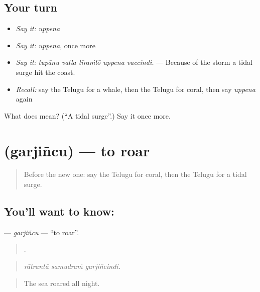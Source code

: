 \subsection*{Your turn}
\begin{itemize}
\raggedright
  \item \emph{Say it:} \emph{uppena}
  \item \emph{Say it:} \emph{uppena}, once more
  \item \emph{Say it:} \emph{tupānu valla tīraṁlō uppena vaccindi.} — Because of the storm a tidal surge hit the coast.
  \item \emph{Recall:} say the Telugu for a whale, then the Telugu for coral, then say \emph{uppena} again
\end{itemize}

\begin{tcolorbox}[breakable,colback=teal!4,colframe=teal!35!black,title={Before you move on}]
What does  mean? (\textquotedblleft{}A tidal surge\textquotedblright{}.) Say it once more.
\end{tcolorbox}
\section[\texorpdfstring{\te{గర్జించు} (garjiñcu)}{గర్జించు (garjiñcu)}]{ (garjiñcu) — to roar}

\label{lesson:TE-C473-garjincu}



\begin{quote}
Before the new one: say the Telugu for coral, then the Telugu for a tidal surge.
\end{quote}

\subsection*{You'll want to know: }
\textbf{} — \emph{garjiñcu} — \textquotedblleft{}to roar\textquotedblright{}.

\begin{quote}
  .
\end{quote}

\begin{quote}
\emph{rātrantā samudraṁ garjiñcindi.}
\end{quote}

\begin{quote}
The sea roared all night.
\end{quote}

